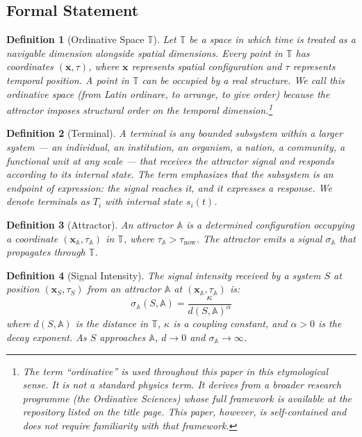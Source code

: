 \documentclass[12pt,a4paper]{article}
\newtheorem{definition}{Definition}[section]
\newcommand{\attr}{\mathbb{A}}
\newcommand{\tspc}{\mathbb{T}}
\begin{document}
\subsection{Formal Statement}

\begin{definition}[Ordinative Space $\tspc$]\label{def:space}
Let $\tspc$ be a space in which time is treated as a navigable dimension alongside spatial dimensions. Every point in $\tspc$ has coordinates $(\mathbf{x}, \tau)$, where $\mathbf{x}$ represents spatial configuration and $\tau$ represents temporal position. A point in $\tspc$ can be occupied by a real structure. We call this \emph{ordinative} space (from Latin \emph{ordinare}, to arrange, to give order) because the attractor imposes structural order on the temporal dimension.\footnote{The term ``ordinative'' is used throughout this paper in this etymological sense. It is not a standard physics term. It derives from a broader research programme (the Ordinative Sciences) whose full framework is available at the repository listed on the title page. This paper, however, is self-contained and does not require familiarity with that framework.}
\end{definition}

\begin{definition}[Terminal]\label{def:terminal}
A \emph{terminal} is any bounded subsystem within a larger system --- an individual, an institution, an organism, a nation, a community, a functional unit at any scale --- that receives the attractor signal and responds according to its internal state. The term emphasizes that the subsystem is an \emph{endpoint of expression}: the signal reaches it, and it expresses a response. We denote terminals as $T_i$ with internal state $s_i(t)$.
\end{definition}

\begin{definition}[Attractor]\label{def:attractor}
An attractor $\attr$ is a determined configuration occupying a coordinate $(\mathbf{x}_\attr, \tau_\attr)$ in $\tspc$, where $\tau_\attr > \tau_{\mathrm{now}}$. The attractor emits a signal $\sigma_{\mathbb{A}}$ that propagates through $\tspc$.
\end{definition}

\begin{definition}[Signal Intensity]\label{def:signal}
The signal intensity received by a system $S$ at position $(\mathbf{x}_S, \tau_S)$ from an attractor $\attr$ at $(\mathbf{x}_\attr, \tau_\attr)$ is:
\begin{equation}\label{eq:signal}
\sigma_{\mathbb{A}}(S, \attr) = \frac{\kappa}{d(S, \attr)^\alpha}
\end{equation}
where $d(S, \attr)$ is the distance in $\tspc$, $\kappa$ is a coupling constant, and $\alpha > 0$ is the decay exponent. As $S$ approaches $\attr$, $d \to 0$ and $\sigma_{\mathbb{A}} \to \infty$.
\end{definition}
\end{document}
